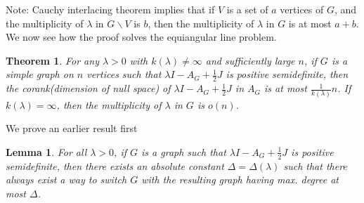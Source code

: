 \documentclass{article}
\theoremstyle{definition} %
\theoremstyle{plain} %
\newtheorem{theorem}{Theorem}
\newtheorem{lemma}{Lemma}
\begin{document}
Note: Cauchy interlacing theorem implies that if $V$ is a set of $a$ vertices of $G$, and the multiplicity of $\lambda$ in $G\backslash V$ is $b$, then the multiplicity of $\lambda$ in $G$ is at most $a+b$.
\clearpage
We now see how the proof solves the equiangular line problem.
\begin{theorem}
For any $\lambda > 0$ with $k(\lambda)\neq \infty$ and sufficiently large $n$, if $G$ is a simple graph on $n$ vertices such that $\lambda I - A_G + \frac{1}{2}J$ is positive semidefinite, then the corank(dimension of null space) of $\lambda I - A_G + \frac{1}{2}J$ in $A_G$ is at most $\frac{1}{k(\lambda)}n$. If $k(\lambda) = \infty$, then the multiplicity of $\lambda$ in $G$ is $o(n)$.
\end{theorem}
We prove an earlier result first
\begin{lemma}
    For all $\lambda>0$, if $G$ is a graph such that $\lambda I - A_G + \frac{1}{2}J$ is positive semidefinite, then there exists an absolute constant $\Delta = \Delta(\lambda)$ such that there always exist a way to switch $G$ with the resulting graph having max. degree at most $\Delta$.
\end{lemma}
\end{document}
